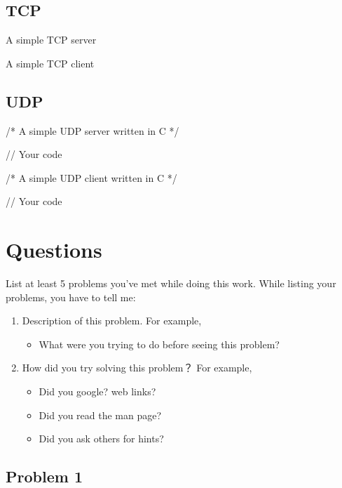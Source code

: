 \documentclass{swfulabreport}
\begin{document}
\subsection{TCP}

\begin{longlisting}
  \caption{A simple TCP server}
\end{longlisting}

\begin{longlisting}
  \caption{A simple TCP client}
\end{longlisting}

\subsection{UDP}

\begin{ccode}
/* A simple UDP server written in C */

// Your code
\end{ccode}

\begin{ccode}
/* A simple UDP client written in C */

// Your code
\end{ccode}

\section{Questions}

List at least 5 problems you've met while doing this work. While
listing your problems, you have to tell me:
\begin{enumerate}
\item Description of this problem. For example,
  \begin{itemize}
  \item What were you trying to do before seeing this problem?
  \end{itemize}
\item How did you try solving this problem？ For example,
  \begin{itemize}
  \item Did you google? web links?
  \item Did you read the man page?
  \item Did you ask others for hints?
  \end{itemize}
\end{enumerate}

\subsection{Problem 1}
\end{document}
